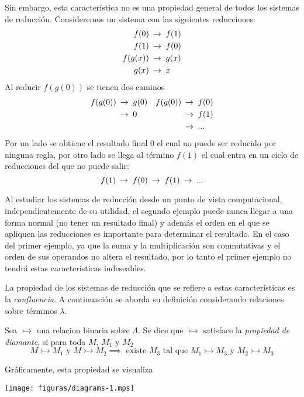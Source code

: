 Sin embargo, esta característica no es una propiedad general de todos los sistemas de reducción. Consideremos un sistema con las siguientes reducciones:
\begin{align*}
  f(0) &\ \operatorname{\rightarrow_{}}\  f(1) \\
  f(1) &\ \operatorname{\rightarrow_{}}\  f(0) \\
  f(g(x)) &\ \operatorname{\rightarrow_{}}\  g(x) \\
  g(x) &\ \operatorname{\rightarrow_{}}\  x
\end{align*}
Al reducir $ f(g(0)) $ se tienen dos caminos
\begin{align*}
  f(g(0)) &\ \operatorname{\rightarrow_{}}\  g(0) & f(g(0)) &\ \operatorname{\rightarrow_{}}\  f(0) \\
          &\ \operatorname{\rightarrow_{}}\  0    &         &\ \operatorname{\rightarrow_{}}\  f(1) \\
  & & &\ \operatorname{\rightarrow_{}}\  ...
\end{align*}
Por un lado se obtiene el resultado final $ 0 $ el cual no puede ser reducido por ninguna regla, por otro lado se llega al término $ f(1) $ el cual entra en un ciclo de reducciones del que no puede salir:
\[ f(1) \ \operatorname{\rightarrow_{}}\  f(0) \ \operatorname{\rightarrow_{}}\  f(1) \ \operatorname{\rightarrow_{}}\  ... \]

Al estudiar los sistemas de reducción desde un punto de vista computacional, independientemente de su utilidad, el segundo ejemplo puede nunca llegar a una forma normal (no tener un resultado final) y además el orden en el que se apliquen las reducciones es importante para determinar el resultado. En el caso del primer ejemplo, ya que la suma y la multiplicación son conmutativas y el orden de sus operandos no altera el resultado, por lo tanto el primer ejemplo no tendrá estas características indeseables.

La propiedad de los sistemas de reducción que se refiere a estas características es la \emph{confluencia}. A continuación se aborda su definición considerando relaciones sobre términos $ λ $.

\begin{defn}
  Sea $ \rightarrowtail $ una relacion binaria sobre $ Λ $. Se dice que $ \rightarrowtail $ satisface la \emph{propiedad de diamante}, si para toda $ M $, $ M_{1} $ y $ M_{2} $
  \[ M \rightarrowtail M_{1} \text{ y } M \rightarrowtail M_{2} \implies \text{ existe } M_{3} \text{ tal que } M_{1} \rightarrowtail M_{3} \text{ y } M_{2} \rightarrowtail M_{3} \]

  Gráficamente, esta propiedad se visualiza
  \begin{center}
    \texttt{[image: figuras/diagrams-1.mps]}
  \end{center}
\end{defn}

